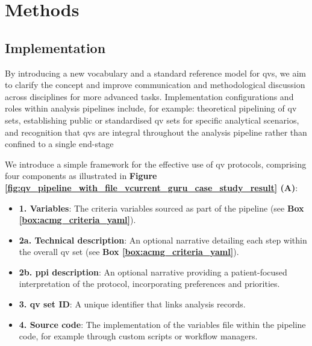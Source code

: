 
\FloatBarrier
\section{Methods}
\subsection{Implementation} \label{sec:framework}

By introducing a new vocabulary and a standard reference model for \ac{qv}s, we aim to clarify the concept and improve communication and methodological discussion across disciplines for more advanced tasks.
Implementation configurations and roles within analysis pipelines include, for example:
theoretical pipelining of \ac{qv} sets,
establishing public or standardised \ac{qv} sets for specific analytical scenarios, and 
recognition that \ac{qv}s are integral throughout the analysis pipeline rather than confined to a single end-stage

We introduce a simple framework for the effective use of \ac{qv} protocols, comprising four components as illustrated in \textbf{Figure \ref{fig:qv_pipeline_with_file_vcurrent_guru_case_study_result} (A)}:

\begin{itemize}
    \item \textbf{1. Variables}: The criteria variables sourced as part of the pipeline (see \textbf{Box \ref{box:acmg_criteria_yaml}}).
    \item \textbf{2a. Technical description}: An optional narrative detailing each step within the overall \ac{qv} set (see \textbf{Box \ref{box:acmg_criteria_yaml}}).
    \item \textbf{2b. \ac{ppi} description}: An optional narrative providing a patient-focused interpretation of the protocol, incorporating preferences and priorities.
    \item \textbf{3. \ac{qv} set ID}: A unique identifier that links analysis records.
    \item \textbf{4. Source code}: The implementation of the variables file within the pipeline code, for example through custom scripts or workflow managers.
\end{itemize}

